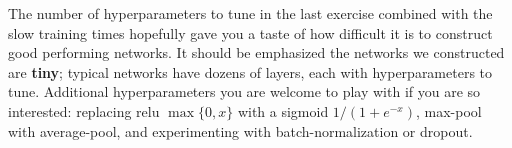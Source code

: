 \documentclass{article}
\newcommand{\1}{\mathbf{1}}
\begin{document}
The number of hyperparameters to tune in the last exercise combined with the slow training times hopefully gave you a taste of how difficult it is to construct good performing networks. 
It should be emphasized the networks we constructed are \textbf{tiny}; typical networks have dozens of layers, each with hyperparameters to tune. 
Additional hyperparameters you are welcome to play with if you are so interested: replacing relu $\max\{0,x\}$ with a sigmoid $1/(1+e^{-x})$, max-pool with average-pool, and experimenting with batch-normalization or dropout.
\end{document}
